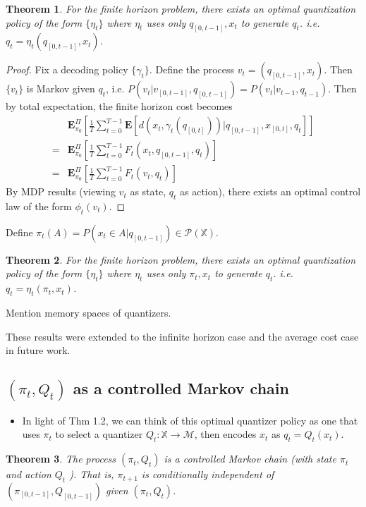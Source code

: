 \documentclass{article}
\newtheorem{theorem}{Theorem}[section]
\begin{document}
\begin{theorem}
    For the finite horizon problem, there exists an optimal quantization policy of the form \(\{\eta_t\}\) where \(\eta_t\) uses only \(q_{[0,t-1]},x_t\) to generate \(q_t\). i.e. \(q_t = \eta_t(q_{[0,t-1]},x_t)\).
\end{theorem}

\begin{proof}
    Fix a decoding policy \(\{\gamma_t\}\). Define the process \(v_t = (q_{[0,t-1]}, x_t)\). Then \(\{v_t\}\) is Markov given \(q_t\), i.e. \( P(v_t | v_{[0,t-1]}, q_{[0,t-1]}) = P(v_t | v_{t-1},q_{t-1}) \). Then by total expectation, the finite horizon cost becomes
    \begin{align*}
         & \mathbf{E}_{\pi_0}^{\Pi}\left[\frac{1}{T}\sum_{t=0}^{T-1}\mathbf{E}[d(x_t,\gamma_t(q_{[0,t]})) | q_{[0,t-1]},x_{[0,t]},q_t]\right] \\ = & \mathbf{E}_{\pi_0}^{\Pi}\left[\frac{1}{T}\sum_{t=0}^{T-1}F_t(x_t, q_{[0,t-1]}, q_t)\right] \\ = &
        \mathbf{E}_{\pi_0}^{\Pi}\left[\frac{1}{T}\sum_{t=0}^{T-1}F_t(v_t, q_t)\right]
    \end{align*}
    By MDP results (viewing \(v_t\) as state, \(q_t\) as action), there exists an optimal control law of the form \(\phi_t(v_t)\).
\end{proof}

Define \(\pi_t(A) = P(x_t \in A | q_{[0,t-1]}) \in \mathcal{P}(\mathbb{X})\).

\begin{theorem}
    For the finite horizon problem, there exists an optimal quantization policy of the form \(\{\eta_t\}\) where \(\eta_t\) uses only \(\pi_t,x_t\) to generate \(q_t\). i.e. \(q_t = \eta_t(\pi_t,x_t)\).
\end{theorem}

Mention memory spaces of quantizers.

These results were extended to the infinite horizon case and the average cost case in future work.

\subsection{\((\pi_t, Q_t)\) as a controlled Markov chain}
\begin{itemize}
    \item In light of Thm 1.2, we can think of this optimal quantizer policy as one that uses \(\pi_t\) to select a quantizer \(Q_t : \mathbb{X} \to \mathcal{M}\), then encodes \(x_t\) as \(q_t = Q_t(x_t)\).
\end{itemize}
\begin{theorem}
    The process \((\pi_t, Q_t)\) is a controlled Markov chain (with state \(\pi_t\) and action \(Q_t\) ). That is, \(\pi_{t+1}\) is conditionally independent of \((\pi_{[0,t-1]}, Q_{[0,t-1]})\) given \((\pi_t,Q_t)\).
\end{theorem}
\end{document}
